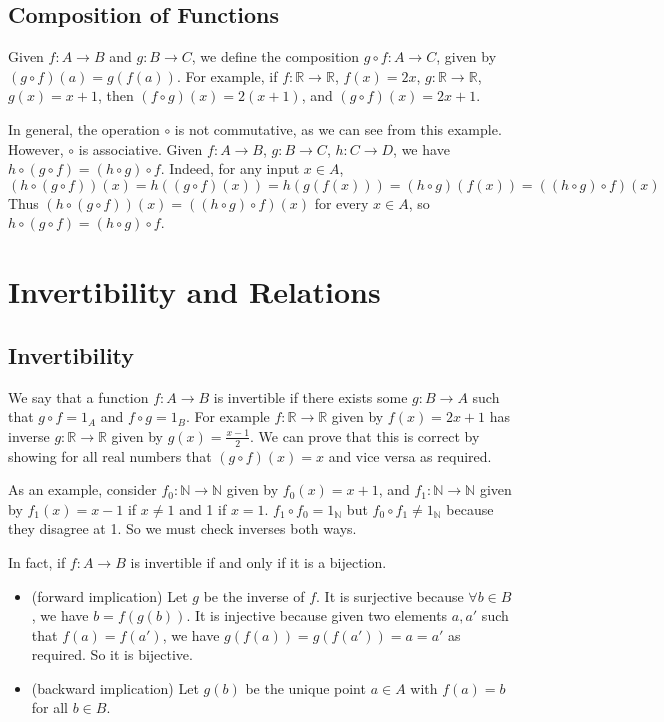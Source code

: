 \documentclass{article}
\begin{document}
	\subsection{Composition of Functions}
	Given $f\colon A \to B$ and $g\colon B \to C$, we define the composition $g\circ f \colon A \to C$, given by $(g\circ f)(a) = g(f(a))$. For example, if $f\colon \mathbb R \to \mathbb R$, $f(x) = 2x$, $g\colon \mathbb R \to \mathbb R$, $g(x) = x+1$, then $(f \circ g)(x) = 2(x+1)$, and $(g \circ f)(x) = 2x + 1$.

	In general, the operation $\circ$ is not commutative, as we can see from this example. However, $\circ$ is associative. Given $f\colon A \to B$, $g\colon B \to C$, $h\colon C \to D$, we have $h \circ (g \circ f) = (h \circ g) \circ f$. Indeed, for any input $x \in A$,
	\[ (h \circ (g \circ f))(x) = h((g \circ f)(x)) = h(g(f(x))) = (h \circ g)(f(x)) = ((h \circ g)\circ f)(x) \]
	Thus $(h \circ (g \circ f))(x) = ((h \circ g)\circ f)(x)$ for every $x \in A$, so $h \circ (g \circ f) = (h \circ g)\circ f$.

	\section{Invertibility and Relations}
	\subsection{Invertibility}
	We say that a function $f\colon A \to B$ is invertible if there exists some $g\colon B \to A$ such that $g \circ f = 1_A$ and $f \circ g = 1_B$. For example $f\colon \mathbb R \to \mathbb R$ given by $f(x)=2x+1$ has inverse $g\colon \mathbb R \to \mathbb R$ given by $g(x)=\frac{x-1}{2}$. We can prove that this is correct by showing for all real numbers that $(g\circ f)(x) = x$ and vice versa as required.

	As an example, consider $f_0\colon \mathbb N \to \mathbb N$ given by $f_0(x)=x+1$, and $f_1\colon \mathbb N \to \mathbb N$ given by $f_1(x) = x-1$ if $x\neq 1$ and 1 if $x=1$. $f_1\circ f_0 = 1_{\mathbb N}$ but $f_0\circ f_1 \neq 1_{\mathbb N}$ because they disagree at 1. So we must check inverses both ways.

	In fact, if $f\colon A \to B$ is invertible if and only if it is a bijection.
	\begin{itemize}
		\item (forward implication) Let $g$ be the inverse of $f$. It is surjective because $\forall b \in B$, we have $b=f(g(b))$. It is injective because given two elements $a,a'$ such that $f(a) = f(a')$, we have $g(f(a)) = g(f(a')) = a = a'$ as required. So it is bijective.
		\item (backward implication) Let $g(b)$ be the unique point $a \in A$ with $f(a) = b$ for all $b \in B$.
	\end{itemize}
\end{document}
